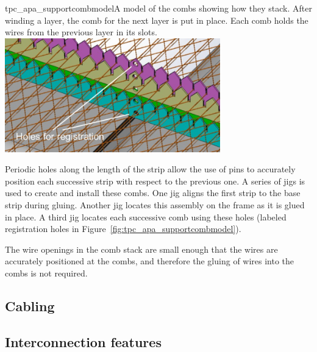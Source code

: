 \begin{cdrfigure}{tpc_apa_supportcombmodel}{A model of the combs showing how they stack.  After winding a layer, the comb for the next layer is put in place.  Each comb holds the wires from the previous layer in its slots.}
\includegraphics[width=0.7\textwidth]{figures/tpc_apa_supportcombmodel.png} 
\end{cdrfigure}

Periodic holes along the length of the strip allow the use of pins to accurately position each successive strip with respect to the previous one.  A series of jigs is used to create and install these combs.  One jig aligns the first strip to the base strip during gluing.  Another jig locates this assembly on the frame as it is glued in place. A third jig locates each successive comb using these holes (labeled registration holes in Figure~\ref{fig:tpc_apa_supportcombmodel}).

The wire openings in the comb stack are small enough that the wires are accurately positioned at the combs, and therefore the gluing of wires into the combs is not required.

\subsection{Cabling}

\subsection{Interconnection features}


